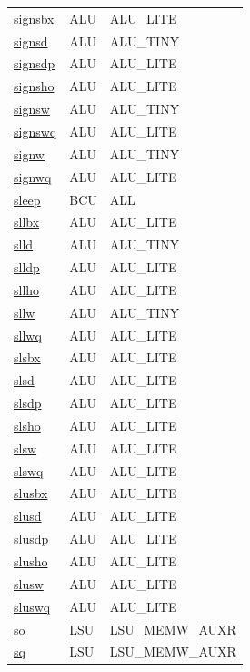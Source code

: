 \begin{small}
\begin{longtable}[l]{l l l}
\hyperlink{lvx.signsbx}{signsbx} & ALU & ALU\_LITE \\ 
\hyperlink{lvx.signsd}{signsd} & ALU & ALU\_TINY \\ 
\hyperlink{lvx.signsdp}{signsdp} & ALU & ALU\_LITE \\ 
\hyperlink{lvx.signsho}{signsho} & ALU & ALU\_LITE \\ 
\hyperlink{lvx.signsw}{signsw} & ALU & ALU\_TINY \\ 
\hyperlink{lvx.signswq}{signswq} & ALU & ALU\_LITE \\ 
\hyperlink{lvx.signw}{signw} & ALU & ALU\_TINY \\ 
\hyperlink{lvx.signwq}{signwq} & ALU & ALU\_LITE \\ 
\hyperlink{lvx.sleep}{sleep} & BCU & ALL \\ 
\hyperlink{lvx.sllbx}{sllbx} & ALU & ALU\_LITE \\ 
\hyperlink{lvx.slld}{slld} & ALU & ALU\_TINY \\ 
\hyperlink{lvx.slldp}{slldp} & ALU & ALU\_LITE \\ 
\hyperlink{lvx.sllho}{sllho} & ALU & ALU\_LITE \\ 
\hyperlink{lvx.sllw}{sllw} & ALU & ALU\_TINY \\ 
\hyperlink{lvx.sllwq}{sllwq} & ALU & ALU\_LITE \\ 
\hyperlink{lvx.slsbx}{slsbx} & ALU & ALU\_LITE \\ 
\hyperlink{lvx.slsd}{slsd} & ALU & ALU\_LITE \\ 
\hyperlink{lvx.slsdp}{slsdp} & ALU & ALU\_LITE \\ 
\hyperlink{lvx.slsho}{slsho} & ALU & ALU\_LITE \\ 
\hyperlink{lvx.slsw}{slsw} & ALU & ALU\_LITE \\ 
\hyperlink{lvx.slswq}{slswq} & ALU & ALU\_LITE \\ 
\hyperlink{lvx.slusbx}{slusbx} & ALU & ALU\_LITE \\ 
\hyperlink{lvx.slusd}{slusd} & ALU & ALU\_LITE \\ 
\hyperlink{lvx.slusdp}{slusdp} & ALU & ALU\_LITE \\ 
\hyperlink{lvx.slusho}{slusho} & ALU & ALU\_LITE \\ 
\hyperlink{lvx.slusw}{slusw} & ALU & ALU\_LITE \\ 
\hyperlink{lvx.sluswq}{sluswq} & ALU & ALU\_LITE \\ 
\hyperlink{lvx.so}{so} & LSU & LSU\_MEMW\_AUXR \\ 
\hyperlink{lvx.sq}{sq} & LSU & LSU\_MEMW\_AUXR \\ 

\end{longtable}
\end{small}
